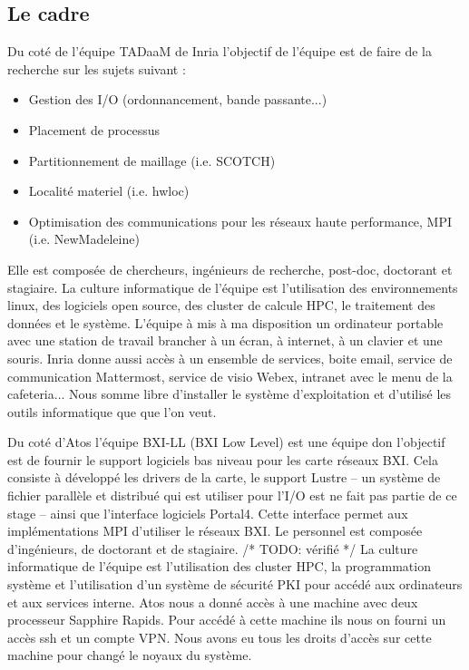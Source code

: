 \subsection{Le cadre}

Du coté de l'équipe TADaaM de Inria l'objectif de l'équipe est de faire de la recherche sur les sujets suivant :

\begin{itemize}
  \item Gestion des I/O (ordonnancement, bande passante...)
  \item Placement de processus
  \item Partitionnement de maillage (i.e. SCOTCH)
  \item Localité materiel (i.e. hwloc)
  \item Optimisation des communications pour les réseaux haute performance, MPI (i.e. NewMadeleine)
\end{itemize}

Elle est composée de chercheurs, ingénieurs de recherche, post-doc, doctorant et stagiaire.
La culture informatique de l'équipe est l'utilisation des environnements linux, des logiciels open source,
des cluster de calcule HPC, le traitement des données et le système.
L'équipe à mis à ma disposition un ordinateur portable avec une station de travail brancher à un écran, à internet, à un clavier et une souris.
Inria donne aussi accès à un ensemble de services, boite email, service de communication Mattermost, service de visio Webex, intranet avec le menu de la cafeteria...
Nous somme libre d'installer le système d'exploitation et d'utilisé les outils informatique que que l'on veut.

Du coté d'Atos l'équipe BXI-LL (BXI Low Level) est une équipe don l'objectif est de fournir le support logiciels bas niveau pour les carte réseaux BXI.
Cela consiste à développé les drivers de la carte, le support Lustre -- un système de fichier parallèle et distribué qui est utiliser pour l'I/O est ne fait pas partie de ce stage -- ainsi que l'interface logiciels Portal4.
Cette interface permet aux implémentations MPI d'utiliser le réseaux BXI.
Le personnel est composée d'ingénieurs, de doctorant et de stagiaire. /* TODO: vérifié */
La culture informatique de l'équipe est l'utilisation des cluster HPC, la programmation système et l'utilisation d'un système de sécurité PKI pour accédé aux ordinateurs et aux services interne.
Atos nous a donné accès à une machine avec deux processeur \intel{} Sapphire Rapids.
Pour accédé à cette machine ils nous on fourni un accès ssh et un compte VPN.
Nous avons eu tous les droits d'accès sur cette machine pour changé le noyaux du système.

